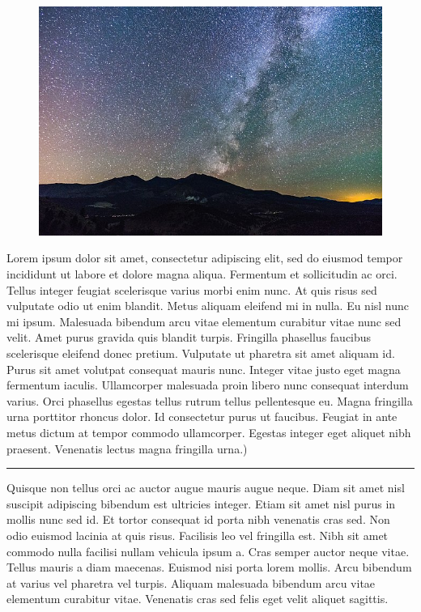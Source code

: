 \documentclass[10pt]{article} %
\newcommand*{\noind}{\setlength{\parindent}{0cm}} %
\newcommand{\medhdr}[1][]{%
	{\noind{\Large\bfseries\headingfont{#1}}}
	\vspace{-9pt}

	\noindent\rule{2.75in}{2pt} %
}
\begin{document}
\begin{multicols}{2}
\begin{figure}[ht] %
\centering
\includegraphics[width=\textwidth]{universe.jpg} 
\end{figure}

Lorem ipsum dolor sit amet, consectetur adipiscing elit, sed do eiusmod tempor incididunt ut labore et dolore magna aliqua. Fermentum et sollicitudin ac orci. Tellus integer feugiat scelerisque varius morbi enim nunc. At quis risus sed vulputate odio ut enim blandit. Metus aliquam eleifend mi in nulla. Eu nisl nunc mi ipsum. Malesuada bibendum arcu vitae elementum curabitur vitae nunc sed velit. Amet purus gravida quis blandit turpis. Fringilla phasellus faucibus scelerisque eleifend donec pretium. Vulputate ut pharetra sit amet aliquam id. Purus sit amet volutpat consequat mauris nunc. Integer vitae justo eget magna fermentum iaculis. Ullamcorper malesuada proin libero nunc consequat interdum varius. Orci phasellus egestas tellus rutrum tellus pellentesque eu. Magna fringilla urna porttitor rhoncus dolor. Id consectetur purus ut faucibus. Feugiat in ante metus dictum at tempor commodo ullamcorper. Egestas integer eget aliquet nibh praesent. Venenatis lectus magna fringilla urna.)\\

\medhdr[SMALL SECTION] %
{\noind
Quisque non tellus orci ac auctor augue mauris augue neque. Diam sit amet nisl suscipit adipiscing bibendum est ultricies integer. Etiam sit amet nisl purus in mollis nunc sed id. Et tortor consequat id porta nibh venenatis cras sed. Non odio euismod lacinia at quis risus. Facilisis leo vel fringilla est. Nibh sit amet commodo nulla facilisi nullam vehicula ipsum a. Cras semper auctor neque vitae. Tellus mauris a diam maecenas. Euismod nisi porta lorem mollis. Arcu bibendum at varius vel pharetra vel turpis. Aliquam malesuada bibendum arcu vitae elementum curabitur vitae. Venenatis cras sed felis eget velit aliquet sagittis.\\
}



\end{multicols}
\end{document}
